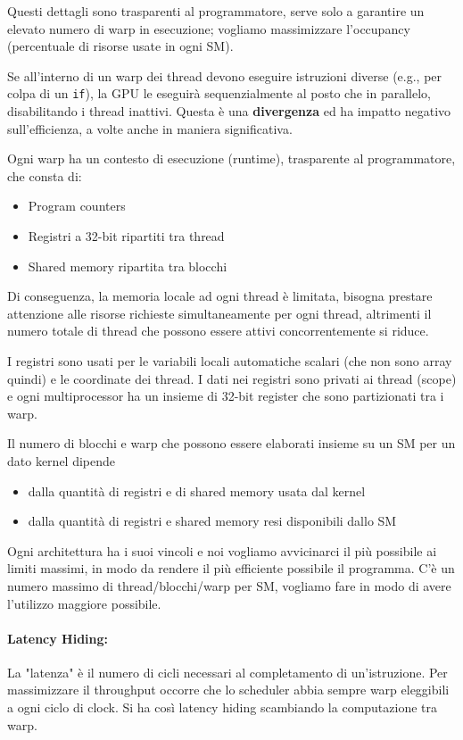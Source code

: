 Questi dettagli sono trasparenti al programmatore, serve solo a garantire un elevato numero di warp in esecuzione; vogliamo massimizzare l'occupancy (percentuale di risorse usate in ogni SM).

Se all'interno di un warp dei thread devono eseguire istruzioni diverse (e.g., per colpa di un \texttt{if}), la GPU le eseguirà sequenzialmente al posto che in parallelo, disabilitando i thread inattivi. Questa è una \textbf{divergenza} ed ha impatto negativo sull'efficienza, a volte anche in maniera significativa. 

Ogni warp ha un contesto di esecuzione (runtime), trasparente al programmatore, che consta di: 
\begin{itemize}
	\item Program counters
	
	\item Registri a 32-bit ripartiti tra thread
	
	\item Shared memory ripartita tra blocchi
\end{itemize} 

Di conseguenza, la memoria locale ad ogni thread è limitata, bisogna prestare attenzione alle risorse richieste simultaneamente per ogni thread, altrimenti il numero totale di thread che possono essere attivi concorrentemente si riduce.

I registri sono usati per le variabili locali automatiche scalari (che non sono array quindi) e le coordinate dei thread. I dati nei registri sono privati ai thread (scope) e ogni multiprocessor ha un insieme di 32-bit register che sono partizionati tra i warp.

Il numero di blocchi e warp che possono essere elaborati insieme su un SM per un dato kernel dipende
\begin{itemize}
	\item dalla quantità di registri e di shared memory usata dal kernel
	
	\item dalla quantità di registri e shared memory resi disponibili dallo SM
\end{itemize}

Ogni architettura ha i suoi vincoli e noi vogliamo avvicinarci il più possibile ai limiti massimi, in modo da rendere il più efficiente possibile il programma. C'è un numero massimo di thread/blocchi/warp per SM, vogliamo fare in modo di avere l'utilizzo maggiore possibile.

\paragraph{Latency Hiding:} La "latenza" è il numero di cicli necessari al completamento di un'istruzione. Per massimizzare il throughput occorre che lo scheduler abbia sempre warp eleggibili a ogni ciclo di clock. Si ha così latency hiding scambiando la computazione tra warp.


